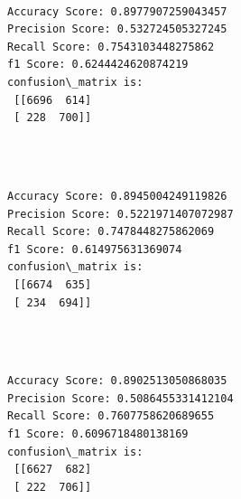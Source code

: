 \documentclass[11pt]{article}
\begin{document}
   

    \begin{center}
    \end{center}
    { \hspace*{\fill} \\}
    
    \begin{Verbatim}[commandchars=\\\{\}]
Accuracy Score: 0.8977907259043457
Precision Score: 0.532724505327245
Recall Score: 0.7543103448275862
f1 Score: 0.6244424620874219
confusion\_matrix is: 
 [[6696  614]
 [ 228  700]] 


    \end{Verbatim}

   

    \begin{center}
    \end{center}
    { \hspace*{\fill} \\}
    
    \begin{Verbatim}[commandchars=\\\{\}]
Accuracy Score: 0.8945004249119826
Precision Score: 0.5221971407072987
Recall Score: 0.7478448275862069
f1 Score: 0.614975631369074
confusion\_matrix is: 
 [[6674  635]
 [ 234  694]] 


    \end{Verbatim}

   

    \begin{center}
    \end{center}
    { \hspace*{\fill} \\}
    
    \begin{Verbatim}[commandchars=\\\{\}]
Accuracy Score: 0.8902513050868035
Precision Score: 0.5086455331412104
Recall Score: 0.7607758620689655
f1 Score: 0.6096718480138169
confusion\_matrix is: 
 [[6627  682]
 [ 222  706]] 


    \end{Verbatim}

   

    \begin{center}
    \end{center}
    { \hspace*{\fill} \\}
    
\end{document}

